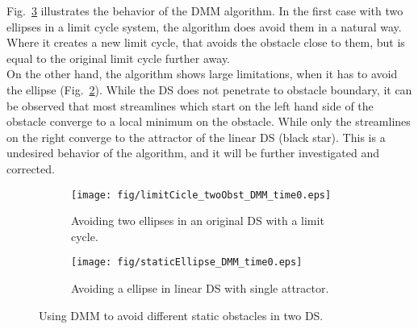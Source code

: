 Fig.~\ref{fig:static_DMM} illustrates the behavior of the DMM algorithm. In the first case with two ellipses in a limit cycle system, the algorithm does avoid them in a natural way. Where it creates a new limit cycle, that avoids the obstacle close to them, but is equal to the original limit cycle further away. \\
On the other hand, the algorithm shows large limitations, when it has to avoid the ellipse (Fig.~\ref{fig:staticEllipse_DMM_time0}). While the DS does not penetrate to obstacle boundary, it can be observed that most streamlines which start on the left hand side of the obstacle converge to a local minimum on the obstacle. While only the streamlines on the right converge to the attractor of the linear DS (black star). This is a undesired behavior of the algorithm, and it will be further investigated and corrected.
\begin{figure}[tb]\centering
\begin{subfigure}{.48\columnwidth} %
\centering
\texttt{[image: fig/limitCicle\_twoObst\_DMM\_time0.eps]}
\caption{Avoiding two ellipses in an original DS with a limit cycle.}
\label{fig:limitCicle_twoObst_DMM_time0}
\end{subfigure}
\begin{subfigure}{.48\columnwidth} %
\centering
\texttt{[image: fig/staticEllipse\_DMM\_time0.eps]}
\caption{Avoiding a ellipse in linear DS with single attractor.}
\label{fig:staticEllipse_DMM_time0}
\end{subfigure}
\caption{Using DMM to avoid different static obstacles in two DS.}
\label{fig:static_DMM}
\end{figure}


